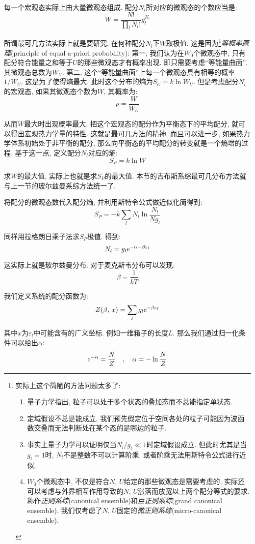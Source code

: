 每一个宏观态实际上由大量微观态组成. 配分$N_l$所对应的微观态的个数应当是:
\[W=\frac{N!}{\displaystyle\prod_l N_l!}g_l^{N_l}\]

所谓最可几方法实际上就是要研究, 在何种配分$N_l$下$W$取极值. 这是因为\footnote{实际上这个简陋的方法问题太多了: \begin{enumerate}
	\item 量子力学指出, 粒子可以处于多个状态的叠加态而不总能指定单状态.
	\item 定域假设不总是能成立, 我们预先假定位于空间各处的粒子可能因为波函数交叠而无法判断处在某个态的是哪边的粒子.
	\item 事实上量子力学可以证明仅当$N_l/g_l\ll 1$时定域假设成立. 但此时尤其是当$g_l=1$时, $N_l$不是整数不可以计算阶乘, 或者阶乘无法用斯特令公式进行近似.
	\item $W_0$个微观态中, 不仅是符合$N,\,U$给定的那些微观态是需要考虑的, 实际还可以考虑与外界相互作用导致的$N,\,U$涨落而放宽以上两个配分等式的要求. 称作\emph{正则系综}(canonical ensemble)和\emph{巨正则系综}(grand canonical ensemble). 我们仅考虑了$N,\,U$固定的\emph{微正则系综}(micro-canonical ensemble).
\end{enumerate}
}\emph{等概率原理}(principle of equal a-priori probability): 第一, 我们认为在$W_0$个微观态中, 只有配分符合能量之和等于$U$的那些微观态才有概率出现. 即只需要考虑``等能量曲面'', 其微观态总数为$W_U$. 第二, 这个``等能量曲面''上每一个微观态具有相等的概率$1/W_U$, 这是为了使得熵最大. 此时这个分布的熵为$S_U=k\ln W_U$. 但是考虑配分$N_l$的宏观态, 如果其微观态个数为$W$, 其概率为:
\[p=\frac{W}{W_U}\]

从而$W$最大时出现概率最大, 把这个宏观态的配分作为平衡态下的平均配分, 就可以得出宏观热力学量的特性. 这就是最可几方法的精神. 而且可以进一步, 如果热力学体系初始处于非平衡的配分, 那么向平衡态的平均配分的转变就是一个熵增的过程. 基于这一点, 定义配分$N_l$对应的熵:
\[S_P=k\ln W\]

求$W$的最大值, 实际上也就是求$S_P$的最大值. 本节的吉布斯系综最可几分布方法就与上一节的玻尔兹曼系综方法统一了.

将配分的微观态数代入配分熵, 并利用斯特令公式做近似化简得到:
\[S_P=-k\sum_l N_l\ln\frac{N_l}{Ng_l}\]

同样用拉格朗日乘子法求$S_P$极值. 得到:
\[N_l=g_l{\rm e}^{-\alpha-\beta \varepsilon_l}\]

这实际上就是玻尔兹曼分布. 对于麦克斯韦分布可以发现:
\[\beta=\frac{1}{kT}\]

我们定义系统的配分函数为:
\[Z(\beta,\,x)=\sum_l g_l{\rm e}^{-\beta \varepsilon_l}\]

其中$x$为$\varepsilon_l$中可能含有的广义坐标. 例如一维箱子的长度$L$. 那么我们通过归一化条件可以给出$\alpha$:
\[{\rm e}^{-\alpha}=\frac{N}{Z} \quad,\quad \alpha=-\ln\frac{N}{Z}\]


